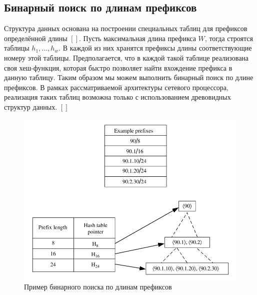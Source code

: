 \documentclass[a4peper, 12pt, titlepage, finall]{report}
\begin{document}
        \subsection{Бинарный поиск по длинам префиксов}
            Структура данных основана на построении специальных таблиц для префиксов определённой длины $[ ]$. Пусть максимальная длина префикса {\ttfamily $W$}, 
            тогда строятся таблицы {\ttfamily $h_{1},\ldots,h_{w}$}. В каждой из них хранятся префиксы длины соответствующие номеру этой таблицы. Предполагается, 
            что в каждой такой таблице реализована своя хеш-функция, которая быстро позволяет найти вхождение префикса в данную таблицу.
            Таким образом мы можем выполнить бинарный поиск по длине префиксов. В рамках рассматриваемой архитектуры сетевого процессора, реализация таких таблиц возможна только
            с использованием древовидных структур данных. $[ ]$

            \begin{figure}[h]
                \centering
                \includegraphics[width=\textwidth]{binary_search.png}
                \caption{Пример бинарного поиска по длинам префиксов}\label{fig:mesh4}
            \end{figure}
\end{document}
